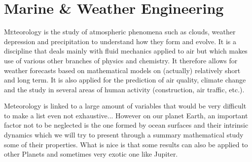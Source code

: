 \section{Marine \& Weather Engineering}
	\lettrine[lines=4]{\color{BrickRed}M}eteorology is the study of atmospheric phenomena such as clouds, weather depression and precipitation to understand how they form and evolve. It is a discipline that deals mainly with fluid mechanics applied to air but which makes use of various other branches of physics and chemistry. It therefore allows for weather forecasts based on mathematical models on (actually) relatively short and long term. It is also applied for the prediction of air quality, climate change and the study in several areas of human activity (construction, air traffic, etc.).
	
	Meteorology is linked to a large amount of variables that would be very difficult to make a list even not exhaustive... However on our planet Earth, an important factor not to be neglected is the one formed by ocean surfaces and their intrinsic dynamics which we will try to present through a summary mathematical study some of their properties. What is nice is that some results can also be applied to other Planets and sometimes very exotic one like Jupiter.
	
